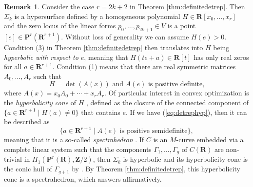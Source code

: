\documentclass[12pt]{amsart}
\newcounter{thmcounter}
\numberwithin{equation}{section}
\numberwithin{thmcounter}{section}
\theoremstyle{definition}
\newtheorem{remark}[thmcounter]{Remark}
\theoremstyle{claim}
\newcommand{\nZ}{\mathbf{Z}}
\newcommand{\nR}{\mathbf{R}}
\newcommand{\nP}{\mathbf{P}}
\begin{document}
\begin{remark}\label{rem:hypcone}
	Consider the case $r=2k+2$ in Theorem \ref{thm:definitedetrep}. Then $\Sigma_k$ is a hypersurface defined by a homogeneous polynomial $H\in\nR[x_0,\ldots,x_r]$ and the zero locus of the linear forms  $p_0,\ldots,p_{2k+1}\in V$ is a point $[e]\in\nP^r(\nR^{r+1})$. Without loss of generality we can assume $H(e)>0$. Condition (3) in Theorem \ref{thm:definitedetrep} then translates into $H$ being \emph{hyperbolic with respect to $e$}, meaning that $H(te+a)\in\nR[t]$ has only real zeros for all $a\in\nR^{r+1}$. Condition (1) means that there are real symmetric matrices $A_0,\ldots,A_r$ such that
	\begin{equation}\label{eq:detrephyp}
	 H=\det(A(x))\textrm{ and }A(e)\textrm{ is positive definite,}
	\end{equation}
 where $A(x)=x_0A_0+\cdots+x_rA_r$. Of particular interest in convex optimization is the \emph{hyperbolicity cone} of $H$ \cite{guler}, defined as the closure of the connected component of $\{a\in\nR^{r+1}\mid H(a)\neq0\}$ that contains $e$. If we have (\ref{eq:detrephyp}), then it can be described as
 \begin{equation*}
  \{a\in\nR^{r+1}\mid A(e)\textrm{ is positive semidefinite}\},
 \end{equation*}
meaning that it is a so-called \emph{spectrahedron} \cite{BPT}.
If $C$ is an $M$-curve embedded via a complete linear system such that the components $\Gamma_1,\ldots,\Gamma_{g}$ of $C(\nR)$ are non-trivial in $H_1(\nP^r(\nR),\nZ/2)$, then $\Sigma_k$ is hyperbolic and its hyperbolicity cone is the conic hull of $\Gamma_{g+1}$ by \cite[Proposition 4.19]{kummersinn}.
By Theorem \ref{thm:definitedetrep}, this hyperbolicity cone is a spectrahedron, which answers \cite[Question (4)]{kummersinn} affirmatively.
\end{remark}
\end{document}
